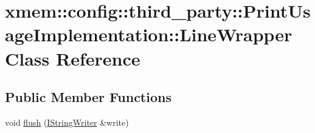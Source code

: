 \hypertarget{classxmem_1_1config_1_1third__party_1_1_print_usage_implementation_1_1_line_wrapper}{\section{xmem\-:\-:config\-:\-:third\-\_\-party\-:\-:Print\-Usage\-Implementation\-:\-:Line\-Wrapper Class Reference}
\label{classxmem_1_1config_1_1third__party_1_1_print_usage_implementation_1_1_line_wrapper}
}
\subsection*{Public Member Functions}
\begin{DoxyCompactItemize}
\item 
\hypertarget{classxmem_1_1config_1_1third__party_1_1_print_usage_implementation_1_1_line_wrapper_afb1b356d9ee69285d3c61f887b5e36c2}{void \hyperlink{classxmem_1_1config_1_1third__party_1_1_print_usage_implementation_1_1_line_wrapper_afb1b356d9ee69285d3c61f887b5e36c2}{flush} (\hyperlink{structxmem_1_1config_1_1third__party_1_1_print_usage_implementation_1_1_i_string_writer}{I\-String\-Writer} \&write)}\label{classxmem_1_1config_1_1third__party_1_1_print_usage_implementation_1_1_line_wrapper_afb1b356d9ee69285d3c61f887b5e36c2}


\end{DoxyCompactItemize}
